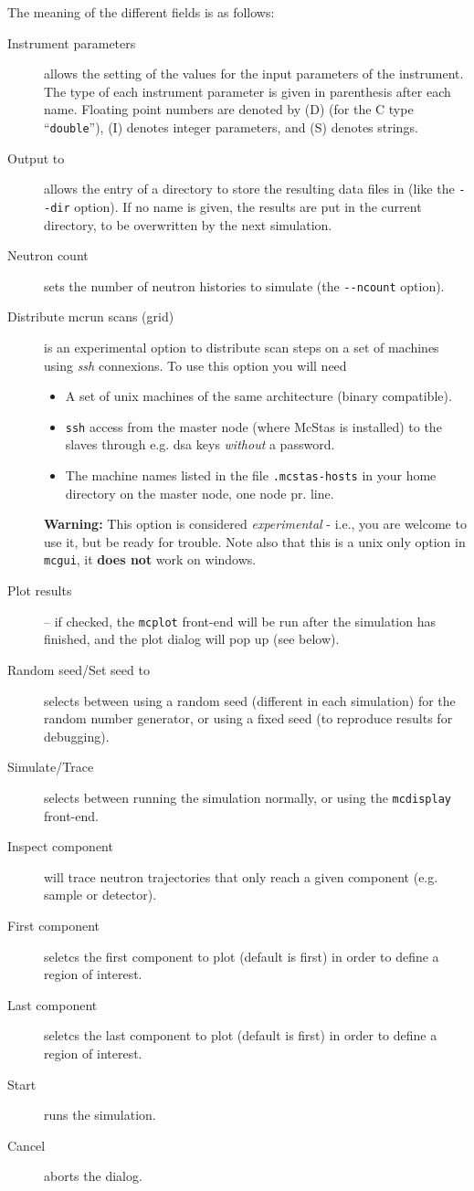 The meaning of the different fields is as follows:
\begin{description}
\item[Instrument parameters] allows the setting of the values for
  the input parameters of the instrument. The type of each instrument
  parameter is given in parenthesis after each name. Floating point
  numbers are denoted by (D) (for the C type ``\verb+double+''), (I)
  denotes integer parameters, and (S) denotes strings.
\item[Output to] allows the entry of a directory to store the
  resulting data files in (like the \verb+--dir+ option). If no name is
  given, the results are put in the current directory, to be overwritten
  by the next simulation.
\item[Neutron count] sets the number of neutron histories to
  simulate (the \verb+--ncount+ option).
\item[Distribute mcrun scans (grid)] is an experimental option to
  distribute scan steps on a set of machines using \emph{ssh}
  connexions. To use this option you will need
  \begin{itemize}
  \item{A set of unix machines of the same architecture (binary compatible).}
  \item{ \texttt{ssh} access from the master node (where McStas is
      installed) to the slaves through e.g. dsa keys \emph{without} a
      password.}
  \item{The machine names listed in the file \texttt{.mcstas-hosts} in
      your home directory on the master node, one node pr. line.}
  \end{itemize}
  {\bf Warning:} This option is considered \emph{experimental} - i.e.,
  you are welcome to use it, but be ready for trouble. Note also that
  this is a unix only option in \texttt{mcgui}, it {\bf does not} work
  on windows.
\item[Plot results] -- if checked, the \verb+mcplot+ front-end will be run
  after the simulation has finished, and the plot dialog will pop up
  (see below).
\item[Random seed/Set seed to] selects between using a random seed (different
  in each simulation) for the random number generator, or using a fixed
  seed (to reproduce results for debugging).
\item[Simulate/Trace] selects between running the simulation
  normally, or using the \verb+mcdisplay+ front-end.
\item[Inspect component] will trace neutron trajectories that only reach a given component (e.g. sample or detector). 
\item[First component] seletcs the first component to plot (default is first) in order to define a region of interest.
\item[Last component] seletcs the last component to plot (default is first) in order to define a region of interest.
\item[Start] runs the simulation.
\item[Cancel] aborts the dialog.
\end{description}

